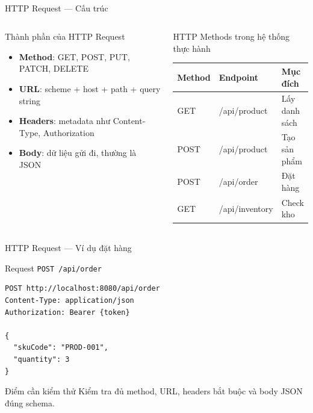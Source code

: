\documentclass[aspectratio=169,10pt]{beamer}
\newcommand{\sref}[1]{\textsuperscript{\scriptsize\cite{#1}}}
\begin{document}
\begin{frame}{HTTP Request --- Cấu trúc\sref{rfc9110}}
  \begin{columns}[T]
    \begin{block}{Thành phần của HTTP Request}
      \begin{itemize}
        \item \textbf{Method}: GET, POST, PUT, PATCH, DELETE
        \item \textbf{URL}: scheme + host + path + query string
        \item \textbf{Headers}: metadata như Content-Type, Authorization
        \item \textbf{Body}: dữ liệu gửi đi, thường là JSON
      \end{itemize}
    \end{block}

    \begin{block}{HTTP Methods trong hệ thống thực hành}
      \scriptsize
      \setlength{\tabcolsep}{3pt}
      \begin{tabular}{lll}
        \toprule
        \textbf{Method} & \textbf{Endpoint} & \textbf{Mục đích} \\
        \midrule
        GET    & /api/product   & Lấy danh sách \\
        POST   & /api/product   & Tạo sản phẩm \\
        POST   & /api/order     & Đặt hàng \\
        GET    & /api/inventory & Check kho \\
        \bottomrule
      \end{tabular}
    \end{block}
  \end{columns}
\end{frame}

\begin{frame}[fragile]{HTTP Request --- Ví dụ đặt hàng\sref{rfc9110}}
  \begin{exampleblock}{Request \texttt{POST /api/order}}
\begin{lstlisting}[style=json,language={}]
POST http://localhost:8080/api/order
Content-Type: application/json
Authorization: Bearer {token}

{
  "skuCode": "PROD-001",
  "quantity": 3
}
\end{lstlisting}
  \end{exampleblock}

  \begin{block}{Điểm cần kiểm thử}
    Kiểm tra đủ method, URL, headers bắt buộc và body JSON đúng schema.
  \end{block}
\end{frame}
\end{document}
